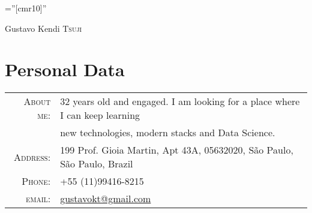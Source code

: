 \documentclass[a4paper,10pt]{article}
\begin{document}

\pagestyle{empty} %

\font\fb=''[cmr10]'' %

\par{\centering
    {\Huge Gustavo Kendi \textsc{Tsuji}
  }\bigskip\par}

\section{Personal Data}

\begin{tabular}{rl}
  \textsc{About me:}   & 32 years old and engaged. I am looking for a place where I can keep learning \\
    &new technologies, modern stacks and Data Science.\\
    \textsc{Address:}   & 199 Prof. Gioia Martin, Apt 43A, 05632020, São Paulo, São Paulo, Brazil \\
    \textsc{Phone:}     & +55 (11)99416-8215\\
    \textsc{email:}     & \href{mailto:gustavokt@gmail.com}{gustavokt@gmail.com}
\end{tabular}

\end{document}
